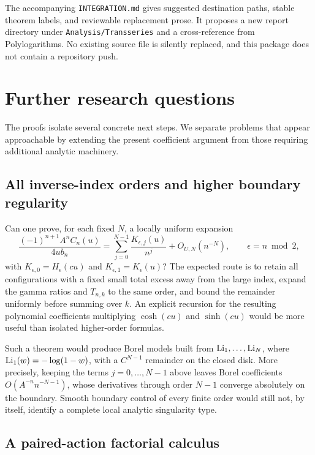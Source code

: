 The accompanying \texttt{INTEGRATION.md} gives suggested destination
paths, stable theorem labels, and reviewable replacement prose. It
proposes a new report directory under \nolinkurl{Analysis/Transseries}
and a cross-reference from Polylogarithms. No existing source file is
silently replaced, and this package does not contain a repository push.

\section{Further research questions}
\label{sec:research}

The proofs isolate several concrete next steps. We separate problems
that appear approachable by extending the present coefficient argument
from those requiring additional analytic machinery.

\subsection{All inverse-index orders and higher boundary regularity}

Can one prove, for each fixed $N$, a locally uniform expansion
\[
 \frac{(-1)^{n+1}A^nC_n(u)}{4ub_n}
 =\sum_{j=0}^{N-1}\frac{K_{\epsilon,j}(u)}{n^j}
                  +O_{U,N}(n^{-N}),\qquad \epsilon=n\bmod2,
\]
with $K_{\epsilon,0}=H_\epsilon(cu)$ and
$K_{\epsilon,1}=K_\epsilon(u)$?
The expected route is to retain all configurations with a fixed small
total excess away from the large index, expand the gamma ratios and
$T_{n,k}$ to the same order, and bound the remainder uniformly before
summing over $k$. An explicit recursion for the resulting polynomial
coefficients multiplying $\cosh(cu)$ and $\sinh(cu)$ would be more useful
than isolated higher-order formulas.

Such a theorem would produce Borel models built from
$\operatorname{Li}_1,\ldots,\operatorname{Li}_N$, where $\operatorname{Li}_1(w)=-\log(1-w)$, with a
$C^{N-1}$ remainder on the closed disk. More precisely, keeping the
terms $j=0,\ldots,N-1$ above leaves Borel coefficients
$O(A^{-n}n^{-N-1})$, whose derivatives through order $N-1$ converge
absolutely on the boundary. Smooth boundary control of every finite
order would still not, by itself, identify a complete local analytic
singularity type.

\subsection{A paired-action factorial calculus}

